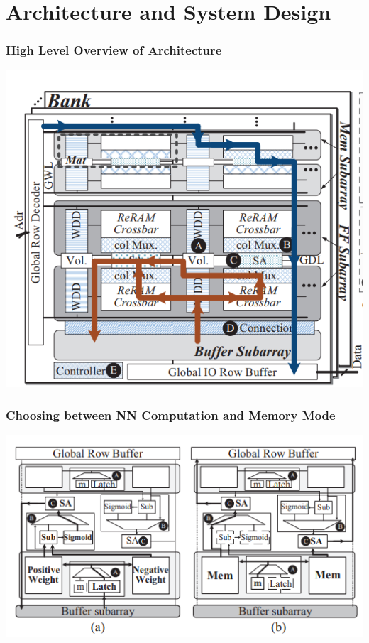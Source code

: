 \documentclass[hyperref={colorlinks}]{beamer}
\begin{document}
\section{Architecture and System Design}
\begin{frame}
	\frametitle{High Level Overview of Architecture}
	\includegraphics[scale=0.4, center]{prime_arch.png}
\end{frame}

\begin{frame}
	\frametitle{Choosing between NN Computation and Memory Mode}
	\includegraphics[scale=0.4, center]{NNvsMem.png}
\end{frame}
\end{document}
